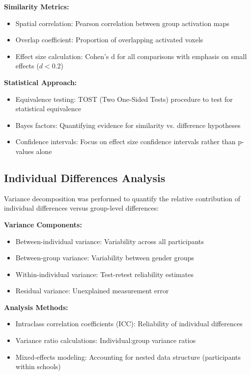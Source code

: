 \documentclass[12pt, a4paper]{article}
\begin{document}
\vspace{0.5\baselineskip}
\noindent
\textbf{Similarity Metrics:}
\begin{itemize}
\item Spatial correlation: Pearson correlation between group activation maps
\item Overlap coefficient: Proportion of overlapping activated voxels
\item Effect size calculation: Cohen's d for all comparisons with emphasis on small effects ($d < 0.2$)
\end{itemize}

\noindent
\textbf{Statistical Approach:}
\begin{itemize}
\item Equivalence testing: TOST (Two One-Sided Tests) procedure to test for statistical equivalence
\item Bayes factors: Quantifying evidence for similarity vs. difference hypotheses
\item Confidence intervals: Focus on effect size confidence intervals rather than p-values alone
\end{itemize}


\subsection{Individual Differences Analysis}
Variance decomposition was performed to quantify the relative contribution of individual differences versus group-level differences:

\vspace{0.5\baselineskip}
\noindent
\textbf{Variance Components:}
\begin{itemize}
\item Between-individual variance: Variability across all participants
\item Between-group variance: Variability between gender groups
\item Within-individual variance: Test-retest reliability estimates
\item Residual variance: Unexplained measurement error
\end{itemize}

\noindent
\textbf{Analysis Methods:}
\begin{itemize}
\item Intraclass correlation coefficients (ICC): Reliability of individual differences
\item Variance ratio calculations: Individual:group variance ratios
\item Mixed-effects modeling: Accounting for nested data structure (participants within schools)
\end{itemize}
\end{document}
